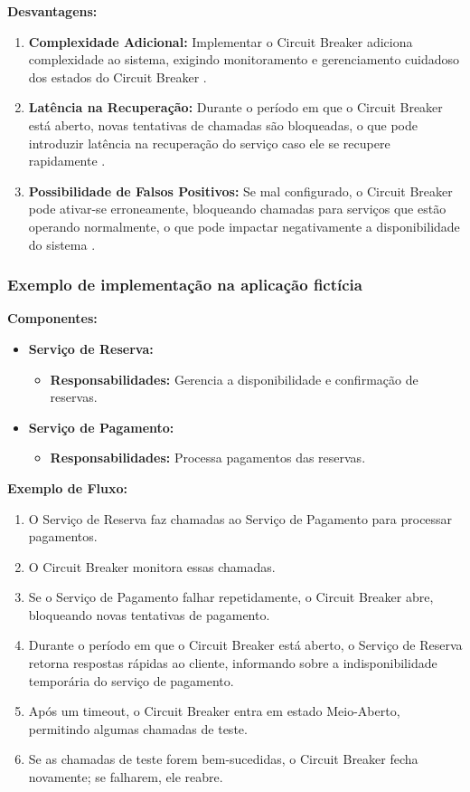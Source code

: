 \textbf{Desvantagens:}

\begin{enumerate}
    \item \textbf{Complexidade Adicional:} Implementar o Circuit Breaker adiciona complexidade ao sistema, exigindo monitoramento e gerenciamento cuidadoso dos estados do Circuit Breaker \cite{fowler2014}.
    \item \textbf{Latência na Recuperação:} Durante o período em que o Circuit Breaker está aberto, novas tentativas de chamadas são bloqueadas, o que pode introduzir latência na recuperação do serviço caso ele se recupere rapidamente \cite{nygard2007}.
    \item \textbf{Possibilidade de Falsos Positivos:} Se mal configurado, o Circuit Breaker pode ativar-se erroneamente, bloqueando chamadas para serviços que estão operando normalmente, o que pode impactar negativamente a disponibilidade do sistema \cite{nygard2007}.
\end{enumerate}

\subsubsection{Exemplo de implementação na aplicação fictícia}

\textbf{Componentes:}

\begin{itemize}
    \item \textbf{Serviço de Reserva:}
    \begin{itemize}
        \item \textbf{Responsabilidades:} Gerencia a disponibilidade e confirmação de reservas.
    \end{itemize}

    \item \textbf{Serviço de Pagamento:}
    \begin{itemize}
        \item \textbf{Responsabilidades:} Processa pagamentos das reservas.
    \end{itemize}
\end{itemize}

\textbf{Exemplo de Fluxo:}

\begin{enumerate}
    \item O Serviço de Reserva faz chamadas ao Serviço de Pagamento para processar pagamentos.
    \item O Circuit Breaker monitora essas chamadas.
    \item Se o Serviço de Pagamento falhar repetidamente, o Circuit Breaker abre, bloqueando novas tentativas de pagamento.
    \item Durante o período em que o Circuit Breaker está aberto, o Serviço de Reserva retorna respostas rápidas ao cliente, informando sobre a indisponibilidade temporária do serviço de pagamento.
    \item Após um timeout, o Circuit Breaker entra em estado Meio-Aberto, permitindo algumas chamadas de teste.
    \item Se as chamadas de teste forem bem-sucedidas, o Circuit Breaker fecha novamente; se falharem, ele reabre.
\end{enumerate}

